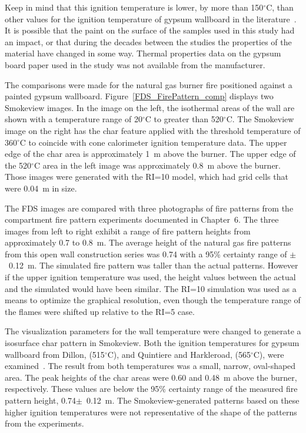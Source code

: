 \documentclass[twoside]{uocthesis}
\begin{document}
{Keep in mind that this ignition temperature is lower, by more than 150$^\circ$C, than other values for the ignition temperature of gypsum wallboard in the literature~\cite{Dillon:1998,Babrauskas:2003}.  It is possible that the paint on the surface of the samples used in this study had an impact, or that during the decades between the studies the properties of the material have changed in some way.  Thermal properties data on the gypsum board paper used in the study was not available from the manufacturer.  

The comparisons were made for the natural gas burner fire positioned against a painted gypsum wallboard.  Figure~\ref{FDS_FirePattern_comp} displays two Smokeview images.  In the image on the left, the isothermal areas of the wall are shown with a temperature range of 20$^\circ$C to greater than 520$^\circ$C.  The Smokeview image on the right has the char feature applied with the threshold temperature of 360$^\circ$C to coincide with cone calorimeter ignition temperature data. The upper edge of the char area is approximately 1~m above the burner.  The upper edge of the 520$^\circ$C area in the left image was approximately 0.8~m above the burner. Those images were generated with the RI=10 model, which had grid cells that were 0.04~m in size. 

The FDS images are compared with three photographs of fire patterns from the compartment fire pattern experiments documented in Chapter~6.  The three images from left to right exhibit a range of fire pattern heights from approximately 0.7 to 0.8~m.  The average height of the natural gas fire patterns from this open wall construction series was 0.74 with a 95\% certainty range of $\pm$~0.12~m. The simulated fire pattern was taller than the actual patterns.  However if the upper ignition temperature was used, the height values between the actual and the simulated would have been similar.  The RI=10 simulation was used as a means to optimize the graphical resolution, even though the temperature range of the flames were shifted up relative to the RI=5 case.   

The visualization parameters for the wall temperature were changed to generate a isosurface char pattern in Smokeview.  Both the ignition temperatures for gypsum wallboard from Dillon, (515$^\circ$C), and Quintiere and Harkleroad, (565$^\circ$C), were examined~\cite{Dillon:1998,Quintiere:1985}.  The result from both temperatures was a small, narrow, oval-shaped area.  The peak heights of the char areas were 0.60 and 0.48~m above the burner, respectively.  These values are below the 95\% certainty range of the measured fire pattern height, 0.74$\pm$~0.12~m. The Smokeview-generated patterns based on these higher ignition temperatures were not representative of the shape of the patterns from the experiments.

}
\end{document}
